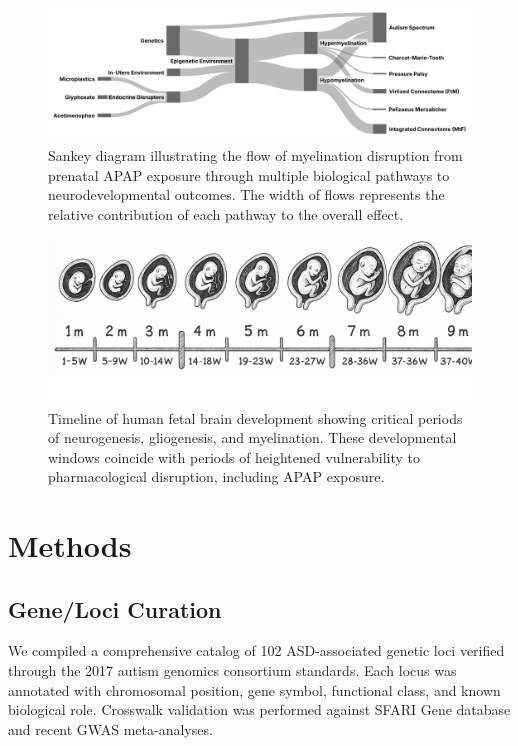 \documentclass[11pt]{article}
\let\oldsection\section
\renewcommand{\section}[1]{\oldsection{#1}\setlength{\leftskip}{0em}}
\let\oldsubsection\subsection
\renewcommand{\subsection}[1]{\oldsubsection{#1}\setlength{\leftskip}{0.75em}}
\begin{document}
\begin{figure}[h]
\centering
\includegraphics[width=\textwidth]{../assets/Myelination-Sankey.jpg}
\caption{Sankey diagram illustrating the flow of myelination disruption from prenatal APAP exposure through multiple biological pathways to neurodevelopmental outcomes. The width of flows represents the relative contribution of each pathway to the overall effect.}
\label{fig:sankey}
\end{figure}

\begin{figure}[h]
\centering
\includegraphics[width=\textwidth]{../assets/fetal-development.jpg}
\caption{Timeline of human fetal brain development showing critical periods of neurogenesis, gliogenesis, and myelination. These developmental windows coincide with periods of heightened vulnerability to pharmacological disruption, including APAP exposure.}
\label{fig:fetaldevelopment}
\end{figure}

\section{Methods}

\subsection{Gene/Loci Curation}
We compiled a comprehensive catalog of 102 ASD-associated genetic loci verified through the 2017 autism genomics consortium standards. Each locus was annotated with chromosomal position, gene symbol, functional class, and known biological role. Crosswalk validation was performed against SFARI Gene database and recent GWAS meta-analyses.
\end{document}
